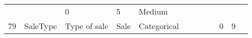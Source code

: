 \documentclass[11pt]{article}
\begin{document}
\begin{longtable}[]{@{}llllllllllll@{}}
\begin{minipage}[t]{0.04\columnwidth}
\strut
\end{minipage} & \begin{minipage}[t]{0.04\columnwidth}\raggedright\strut
\strut
\end{minipage} & \begin{minipage}[t]{0.04\columnwidth}\raggedright\strut
0\strut
\end{minipage} & \begin{minipage}[t]{0.04\columnwidth}\raggedright\strut
5\strut
\end{minipage} & \begin{minipage}[t]{0.04\columnwidth}\raggedright\strut
Medium\strut
\end{minipage}\tabularnewline
\begin{minipage}[t]{0.04\columnwidth}\raggedright\strut
79\strut
\end{minipage} & \begin{minipage}[t]{0.04\columnwidth}\raggedright\strut
SaleType\strut
\end{minipage} & \begin{minipage}[t]{0.04\columnwidth}\raggedright\strut
Type of sale\strut
\end{minipage} & \begin{minipage}[t]{0.04\columnwidth}\raggedright\strut
Sale\strut
\end{minipage} & \begin{minipage}[t]{0.04\columnwidth}\raggedright\strut
Categorical\strut
\end{minipage} & \begin{minipage}[t]{0.04\columnwidth}\raggedright\strut
\strut
\end{minipage} & \begin{minipage}[t]{0.04\columnwidth}\raggedright\strut
\strut
\end{minipage} & \begin{minipage}[t]{0.04\columnwidth}\raggedright\strut
\strut
\end{minipage} & \begin{minipage}[t]{0.04\columnwidth}\raggedright\strut
\strut
\end{minipage} & \begin{minipage}[t]{0.04\columnwidth}\raggedright\strut
0\strut
\end{minipage} & \begin{minipage}[t]{0.04\columnwidth}\raggedright\strut
9\strut
\end{minipage} & \begin{minipage}[t]{0.04\columnwidth}\raggedright\strut

\end{minipage}
\end{longtable}
\end{document}
